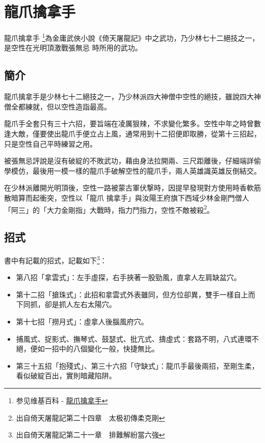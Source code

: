 \chapter{龍爪擒拿手}
龍爪擒拿手
\footnote{参见维基百科 - \href{http://zh.wikipedia.org/wiki/\%E9\%BE\%8D\%E7\%88\%AA\%E6\%93\%92\%E6\%8B\%BF\%E6\%89\%8B}{
    龍爪擒拿手}}為金庸武俠小說《倚天屠龍記》中之武功，乃少林七十二絕技之一，是空性在光明頂激戰張無忌
時所用的武功。

\section{簡介}

龍爪擒拿手是少林七十二絕技之一，乃少林派四大神僧中空性的絕技，雖說四大神僧全都練就，但以空性造詣最高。

龍爪手全套只有三十六招，要旨端在凌厲狠辣，不求變化繁多。空性中年之時曾數逢大敵，僅要使出龍爪手便立占上風，通常用到十二招便即取勝，從第十三招起，只是空性自己平時練習之用。

被張無忌評說是沒有破綻的不敗武功，藉由身法拉開兩、三尺距離後，仔細端詳偷學模仿，最後用一模一樣的龍爪手破解空性的龍爪手，兩人英雄識英雄反倒結交。

在少林派離開光明頂後，空性一路被蒙古軍伏撃時，因提早發現對方使用時香軟筋散暗算而起衝突，空性以「龍爪
擒拿手」與汝陽王府旗下西域少林金剛門僧人「阿三」的「大力金剛指」大戰時，指力鬥指力，空性不敵被殺\footnote{出自倚天屠龍記第二十四章　太极初傳柔克剛}。

\section{招式}

書中有記載的招式，記載如下\footnote{出自倚天屠龍記第二十一章　排難解紛當六強}：

\begin{itemize}
\item 第八招「拿雲式」：左手虛探，右手挾著一股勁風，直拿人左肩缺盆穴。
\item 第十二招「搶珠式」：此招和拿雲式外表雖同，但方位卻異，雙手一樣自上而下同抓，卻是抓人左右太陽穴。
\item 第十七招「撈月式」：虛拿人後腦風府穴。
\item 捕風式、捉影式、撫琴式、鼓瑟式、批亢式、擣虛式：套路不明，八式連環不絕，便如一招中的八個變化一般，快捷無比。
\item 第三十五招「抱殘式」、第三十六招「守缺式」：龍爪手最後兩招，至剛生柔，看似破綻百出，實則暗藏陷阱。
\end{itemize}

